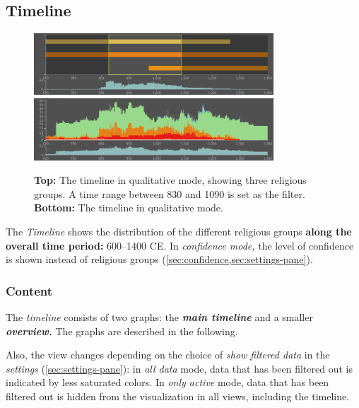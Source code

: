 \subsection{Timeline}
\label{sec:timeline}

\begin{figure}[tb]%
  \centering%
  \includegraphics[width=0.8\textwidth]{../src/assets/visualization-documentation/timeline-1.png}\\\vspace{0.5cm}
  \includegraphics[width=0.8\textwidth]{../src/assets/visualization-documentation/timeline-2.png}%

  \caption{\textbf{Top:}
    The timeline in qualitative mode, showing three religious groups.
    A time range between 830 and 1090 is set as the filter.
    \\
    \textbf{Bottom:}
    The timeline in qualitative mode.
  }
\end{figure}

The \emph{Timeline} shows the distribution of the different religious groups \textbf{along the overall time period:} 600--1400 CE.
In \emph{confidence mode,} the level of confidence is shown instead of religious groups (\cref{sec:confidence,sec:settings-pane}).


\subsubsection{Content}

The \emph{timeline} consists of two graphs:
the \textbf{\emph{main timeline}} and a smaller \textbf{\emph{overview.}}
The graphs are described in the following.

Also, the view changes depending on the choice of \emph{show filtered data} in the \emph{settings} (\cref{sec:settings-pane}):
in \emph{all data} mode, data that has been filtered out is indicated by less saturated colors.
In \emph{only active} mode, data that has been filtered out is hidden from the visualization in all views, including the timeline.

